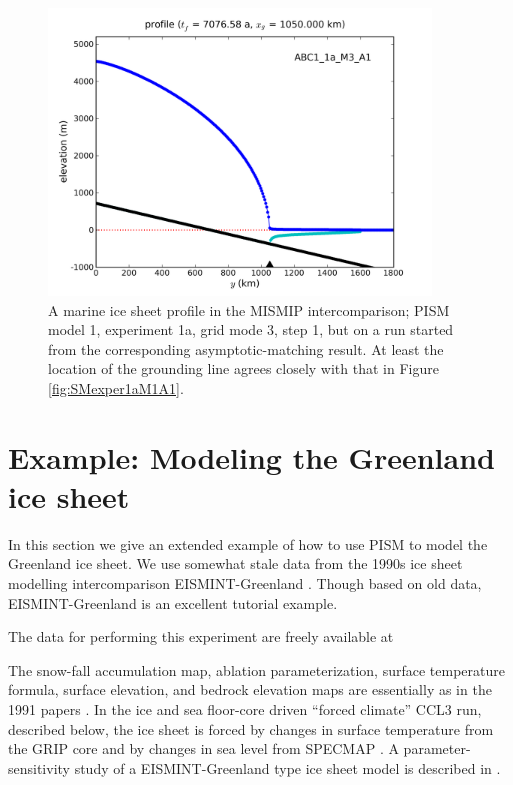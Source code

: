 \documentclass[11pt,final]{amsart}
\begin{document}
\begin{figure}[ht]
\includegraphics[width=4.0in,keepaspectratio=true]{figs/profile_EBU1_1a_M3_A1}
\caption{A marine ice sheet profile in the MISMIP intercomparison; PISM model 1, experiment 1a, grid mode 3, step 1, but on a run started from the corresponding asymptotic-matching result.  At least the location of the grounding line agrees closely with that in Figure \ref{fig:SMexper1aM1A1}.}
\label{fig:MISMIPmodel1exper1aM3A1FROMSM}
\end{figure}


\clearpage\newpage

\section{Example: Modeling the Greenland ice sheet}\label{sect:green}  

In this section we give an extended example of how to use PISM to model the Greenland ice sheet.  We use somewhat stale data from the 1990s ice sheet modelling intercomparison EISMINT-Greenland \cite{HuybrechtsEISMINT,RitzEISMINT}.  Though based on old data, EISMINT-Greenland is an excellent tutorial example.

The data for performing this experiment are freely available at
\medskip

\centerline{}
\medskip

\noindent The snow-fall accumulation map, ablation parameterization, surface temperature formula, surface elevation, and bedrock elevation maps are essentially as in the 1991 papers \cite{Letreguillyetal1991,OhmuraReeh}.  In the ice and sea floor-core driven ``forced climate'' CCL3 run, described below, the ice sheet is forced by changes in surface temperature from the GRIP core \cite{Dansgaardetal1993} and by changes in sea level from SPECMAP \cite{Imbrieetal1984}.  A parameter-sensitivity study of a EISMINT-Greenland type ice sheet model is described in \cite{RitzFabreLetreguilly}.
\end{document}

